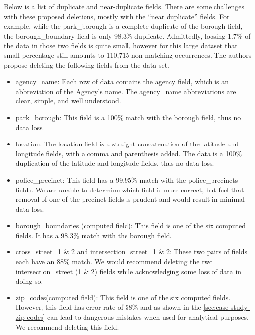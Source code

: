 \documentclass[12pt, titlepage]{article}
\begin{document}
 
Below is a list of duplicate and near-duplicate fields. There are 
some challenges with these proposed deletions, mostly with 
the ``near duplicate'' fields.  For example, while the park\_borough is 
a complete duplicate of the borough field, the 
borough\_boundary field is only 98.3\% duplicate. Admittedly, 
loosing 1.7\% of the data in those two fields is quite small, however
for this large dataset that small percentage still amounts 
to 110,715 non-matching occurrences. The authors  propose 
deleting the following fields from the data set.
 
 
\begin{itemize}
	\item agency\_name: Each row of data contains the agency field, 
	which is an abbreviation of the Agency's name. The agency\_name 
	abbreviations are clear, simple, and well understood.
		    
	\item park\_borough:  This field is a 100\% match with the 
	borough field, thus no data loss. 
		    
	\item location:  The location field is a straight concatenation of 
	the latitude and longitude fields, with a comma and parenthesis 
	added. The data is a 100\% duplication of the latitude 
	and longitude fields, thus no data loss.
		    
	\item police\_precinct: This field has a 99.95\% match with the 
	police\_precincts fields. We are unable to determine which field 
	is more correct, but feel that removal of one of the precinct fields 
	is prudent and would result in minimal data loss.
		   
	\item borough\_boundaries (computed field): This field is one of 
	the six computed fields. It has a 98.3\% match with the borough 
	field.
		    
	\item cross\_street\_1 \& 2 and intersection\_street\_1 \& 2: These 
	two pairs of fields each have an 88\% match. We would recommend 
	deleting the two intersection\_street (1 \& 2) fields while acknowledging 
	some loss of data in doing so.
		     
	\item zip\_codes(computed field):  This field is one of the six 
	computed fields. However, this field has error rate of 58\% and 
	as shown in the \ref{sec:case-study-zip-codes} can lead to 
	dangerous mistakes when used for analytical purposes. We 
	recommend deleting this field.
\end{itemize}
 	
\end{document}
